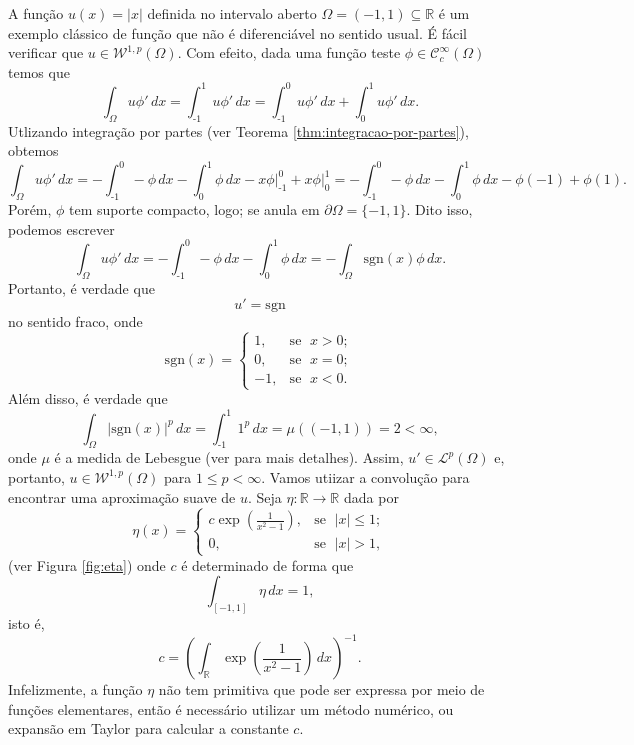 \documentclass[a4paper, 11pt]{book}
\theoremstyle{definition}
\newcommand{\m}{\text{-}}
\newcommand{\bR}{\mathbb{R}}
\newcommand{\cC}{\mathcal{C}}
\newcommand{\cL}{\mathcal{L}}
\newcommand{\cW}{\mathcal{W}}
\newcommand{\sgn}{\mathrm{sgn}}
\begin{document}
\begin{ex}
    A função $u(x) = |x|$ definida no intervalo aberto $\Omega = (-1,1) \subseteq \bR$ é um exemplo clássico de função que não é diferenciável no sentido usual. É fácil verificar que $u \in \cW^{1,p}(\Omega)$. Com efeito, dada uma função teste $\phi \in \cC^\infty_c(\Omega)$ temos que
    \[
        \int_\Omega u \phi' \,dx = \int_{\text{-}1}^1 u \phi' \,dx = \int_{\text{-}1}^0 u \phi' \,dx + \int_0^1 u \phi' \,dx.
    \]
    Utlizando integração por partes (ver Teorema \ref{thm:integracao-por-partes}), obtemos
    \[
        \int_\Omega u \phi'\,dx =  - \int_{\m1}^0 -\phi \,dx  - \int_0^1 \phi \,dx -x \phi \bigg|^{0}_{\m1}+ x\phi \bigg|_0^1 = -\int_{\m1}^{0} - \phi \,dx -\int_0^1 \phi \,dx - \phi(-1) + \phi(1).
    \]
    Porém, $\phi$ tem suporte compacto, logo; se anula em $\partial\Omega = \{-1,1\}$. Dito isso, podemos escrever
    \[
        \int_\Omega u \phi'\,dx = - \int_{\text{-}1}^0 -\phi \,dx - \int_0^1 \phi \,dx = -\int_\Omega \sgn(x)\phi \,dx.
    \]
    Portanto, é verdade que
    \[
        u'= \sgn
    \]
    no sentido fraco, onde
    \[
        \sgn(x) = 
        \left\{ 
            \begin{array}{rr}
                1, &\!\text{se }\; x > 0;\\
                0, &\!\text{se }\; x = 0;\\
                -1,&\!\text{se }\; x < 0.
            \end{array}
        \right.
    \]
    Além disso, é verdade que
    \[
        \int_\Omega |\sgn(x)|^p \,dx = \int_{\text{-}1}^1 1^p \,dx =  \mu((-1,1)) = 2 < \infty,
    \]
    onde $\mu$ é a medida de Lebesgue (ver \cite{axler-measure.theory} para mais detalhes). Assim, $u'\in \cL^p(\Omega)$ e, portanto, $u \in \cW^{1,p}(\Omega)$ para $1 \leqslant p < \infty$.
    Vamos utiizar a convolução para encontrar uma aproximação suave de $u$. 
    Seja $\eta : \bR \to \bR$ dada por
    \[
        \eta(x) = \left\{ 
            \begin{array}{lr}
                c \exp\left(\frac{1}{x^2 - 1} \right), & \text{se }\; |x| \leqslant 1;\\
                0, & \text{se }\; |x| > 1,
            \end{array}
        \right.
    \]
    (ver Figura \ref{fig:eta})
    onde $c$ é determinado de forma que
    \[
        \int_{[-1,1]} \eta \,dx = 1,
    \]
    isto é,
    \[
        c = \left( \int_\bR \exp \left(\frac{1}{x^2 - 1} \right) \, dx\right)^{-1}.
    \]
    Infelizmente, a função $\eta$ não tem primitiva que pode ser expressa por meio de funções elementares, então é necessário utilizar um método numérico, ou expansão em Taylor para calcular a constante $c$.

\end{ex}
\end{document}
